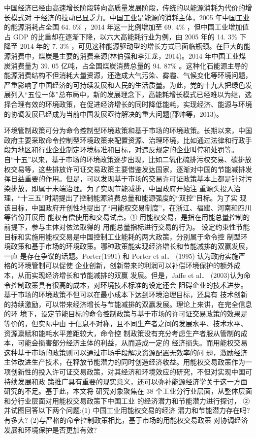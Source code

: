 \documentclass{chinese-erj}
\begin{document}
中国经济已经由高速增长阶段转向高质量发展阶段，传统的以能源消耗为代价的增长模式对
于经济的拉动已显乏力。中国工业是能源的消耗主体，2005 年中国工业的能源消耗占全国
64. 6\% ，2014 年这一比例增加至 69. 4\% ，但中国工业增加值占 GDP 的比重却在逐渐下降，以六大高能耗行业为例，由 2005 年的 14. 3\% 下降至 2014 年的 7. 3\% ，可见这种能源驱动型的增长方式已面临瓶颈。在巨大的能源消费中，煤炭是主要的消费来源(林伯强和李江龙，2014)。2014 年中国工业煤炭消费量为 39. 05 亿吨，占全国煤炭消费总量的 94. 87\% 。这种化石能源主导的能源消费结构不但消耗大量资源，还造成大气污染、雾霾、气候变化等环境问题，严重影响了中国经济的可持续发展和人民的生活质量。为此，党的十九大把绿色发展列入“五位一体”总布局中，新的发展理念下，高能耗增长模式已经难以为继，选择合理有效的环境政策，在促进经济增长的同时降低能耗，实现经济、能源与环境的协调发展已经成为当前中国发展亟待解决的重大问题(邵帅等，2013)。

环境管制政策可分为命令控制型环境政策和基于市场的环境政策。长期以来，中国政府主要采取命令控制型环境政策来配置资源、治理环境，比如通过法律和行政手段为地区和行业企业制定环境标准和目标，对违反规定的企业叫停和处罚等。自“十五”以来，基于市场的环境政策逐步出现，比如二氧化硫排污权交易、碳排放权交易等，这些排放许可证交易政策主要借鉴发达国家，逐渐对中国的节能减排发挥日益重要的作用。但是，可以发现基于市场的交易许可证政策基本上都是针对污染排放，即属于末端治理。为了实现节能减排，中国政府开始注
重源头投入治理，“十三五”时期提出了控制能源消费总量和能源强度的“双控”目标。为了实
现该目标，中国政府开创性地提出了“用能权交易制度”，在浙江、福建、河南和四川等省份开展用
能权有偿使用和交易试点。① 用能权交易，是指在用能总量控制的前提下，参与主体对依法取得的
用能总量指标进行交易的行为。
设定约束性节能目标和实施用能权交易是中国控制工业能耗的两大政策，分别属于命令控
制型环境政策和基于市场的环境政策。哪种政策能实现经济增长和节能减排的双赢发展，一直
是存在争议的话题。Porter(1991) 和 Porter et al． (1995) 认为政府实施严格的环境管制可以促使
企业创新，创新带来的利润可以补偿环境保护的额外成本，从而实现经济增长和节能减排的双赢
发展。但是，Jaffe et al． (2003)认为命令控制政策具有很高的成本，对环境技术标准的设定还会
阻碍企业的技术进步。基于市场的环境政策不但可以在最小成本下达到环境治理目标，还具有
技术创新的持续激励，可以带来经济增长与节能减排的双赢发展。理论上来讲，在完全信息的环
境下，设定节能目标的命令控制政策与基于市场的许可证交易政策的效果是等价的，但实际中由
于信息不对称，且不同生产者之间的发展水平、技术水平、资源禀赋和能耗水平差距较大，命令控
制政策没有充分考虑生产者服从管制的成本，可能会损害部分经济主体的利益，从而造成一定的
经济损失。而用能权交易这种基于市场的政策则可以通过市场手段解决资源配置无效率的问
题，激励经济主体改进生产技术，在释放节能潜力的同时创造经济收益。用能权交易政策作为一
项创新性的投入许可证交易政策，对其经济和环境效应的研究，不但对实现中国可持续发展和政
策推广具有重要的现实意义，还可以弥补能源经济学关于这一方面研究的不足。基于此，本文将
研究对象聚焦在 38 个工业分行业层面，从整体层面和分行业层面对用能权交易政策下中国工业
的经济潜力和节能潜力进行探讨， ② 并试图回答以下两个问题:(1) 中国工业用能权交易的经济
潜力和节能潜力存在吗? 有多大? (2)与严格的命令控制政策相比，基于市场的用能权交易政策
对协调经济发展和环境保护是否更加有效?
\end{document}
